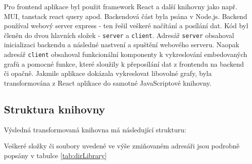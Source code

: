 \documentclass[czech, bc, kiv, he, iso690numb]{fasthesis}
\begin{document}
Pro frontend aplikace byl použit framework React a další knihovny jako např. MUI, tanstack react query apod. Backendová část byla psána v Node.js. Backend používal webový server express - ten
řešil veškeré načítání a posílání dat. Kód byl členěn do dvou hlavních složek - \texttt{server} a \texttt{client}. Adresář \texttt{server} obsahoval inicializaci backendu a následné nastvení a spuštění webového serveru. Naopak
adresář \texttt{client} obsahoval funkcionální komponenty k vykreslování embedovaných grafů a pomocné funkce, které sloužily k přeposílání dat z frontendu na backend či opačně. Jakmile aplikace
dokázala vykreslovat libovolné grafy, byla transformována z React aplikace do samotné JavaScriptové knihovny.

\subsection{Struktura knihovny}

Výsledná transformovaná knihovna má následující strukturu:


Veškeré složky či soubory uvedené ve výše zmiňovaném adresáři jsou podrobně popsány v tabulce \ref{tab:dirLibrary}
\end{document}
